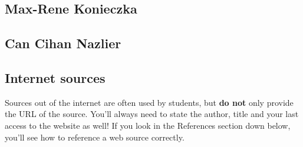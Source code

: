 \documentclass[]{article}
\begin{document}
\subsection{Max-Rene Konieczka}

\subsection{Can Cihan Nazlier}
	



\subsection{Internet sources}
Sources out of the internet are often used by students, but \textbf{do not} only provide the URL of the source. You'll always need to state the author, title and your last access to the website as well! If you look in the References section down below, you'll see how to reference a web source correctly. 

\printbibliography
\end{document}
